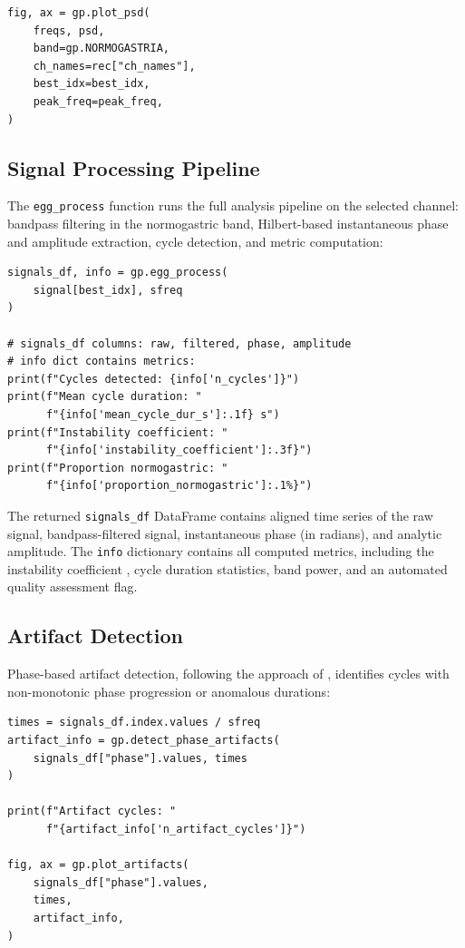 \documentclass[12pt]{article}
\begin{document}
\begin{lstlisting}
fig, ax = gp.plot_psd(
    freqs, psd,
    band=gp.NORMOGASTRIA,
    ch_names=rec["ch_names"],
    best_idx=best_idx,
    peak_freq=peak_freq,
)
\end{lstlisting}

\subsection{Signal Processing Pipeline}

The \texttt{egg\_process} function runs the full analysis pipeline on the
selected channel: bandpass filtering in the normogastric band, Hilbert-based
instantaneous phase and amplitude extraction, cycle detection, and metric
computation:

\begin{lstlisting}
signals_df, info = gp.egg_process(
    signal[best_idx], sfreq
)

# signals_df columns: raw, filtered, phase, amplitude
# info dict contains metrics:
print(f"Cycles detected: {info['n_cycles']}")
print(f"Mean cycle duration: "
      f"{info['mean_cycle_dur_s']:.1f} s")
print(f"Instability coefficient: "
      f"{info['instability_coefficient']:.3f}")
print(f"Proportion normogastric: "
      f"{info['proportion_normogastric']:.1%}")
\end{lstlisting}

The returned \texttt{signals\_df} DataFrame contains aligned time series of the
raw signal, bandpass-filtered signal, instantaneous phase (in radians), and
analytic amplitude. The \texttt{info} dictionary contains all computed metrics,
including the instability coefficient \citep{Koch2004}, cycle duration
statistics, band power, and an automated quality assessment flag.

\subsection{Artifact Detection}

Phase-based artifact detection, following the approach of
\citet{Wolpert2020}, identifies cycles with non-monotonic phase progression or
anomalous durations:

\begin{lstlisting}
times = signals_df.index.values / sfreq
artifact_info = gp.detect_phase_artifacts(
    signals_df["phase"].values, times
)

print(f"Artifact cycles: "
      f"{artifact_info['n_artifact_cycles']}")

fig, ax = gp.plot_artifacts(
    signals_df["phase"].values,
    times,
    artifact_info,
)
\end{lstlisting}
\end{document}
